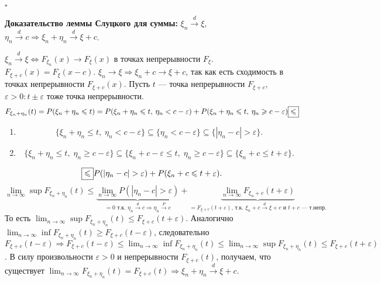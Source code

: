 \documentclass[12pt]{report}
\theoremstyle{definition}
\begin{document}
$\square$


\textbf{Доказательство леммы Слуцкого для суммы:} $\xi_n \xrightarrow{d} \xi$, $\eta_n \xrightarrow{d} c \Rightarrow \xi_n + \eta_n \xrightarrow{d} \xi + c$.

$\xi_n \xrightarrow{d} \xi \Leftrightarrow F_{\xi_n}(x) \rightarrow F_\xi(x)$ в точках непрерывности $F_\xi$. $F_{\xi+c}(x) = F_\xi(x-c)$. $\xi_n \rightarrow \xi \Rightarrow \xi_n + c \rightarrow \xi + c$, так как есть сходимость в точках непрерывности $F_{\xi + c}(x)$.
Пусть $t$ — точка непрерывности $F_{\xi + c}$, $\varepsilon > 0 : t \pm \varepsilon$ тоже точка непрерывности.
$$F_{\xi_n + \eta_n}(t) = P(\xi_n + \eta_n \leqslant t) = P(\xi_n + \eta_n \leqslant t, \:\eta_n < c - \varepsilon) + P(\xi_n + \eta_n \leqslant t, \:\eta_n \geqslant c - \varepsilon) \fbox{$\leqslant$}$$
\begin{enumerate}
	\item $$\{\xi_n + \eta_n \leqslant t, \; \eta_n < c - \varepsilon\} \subseteq \{\eta_n < c - \varepsilon\} \subseteq \{|\eta_n - c| > \varepsilon\}.$$
	\item $$\{\xi_n + \eta_n \leqslant t, \; \eta_n \geqslant c - \varepsilon\} \subseteq \{\xi_n + c - \varepsilon \leqslant t, \; \eta_n \geqslant c - \varepsilon\} \subseteq \{\xi_n + c \leqslant t + \varepsilon\}.$$
\end{enumerate}

$$\fbox{$\leqslant$} P(|\eta_n-c| > \varepsilon) + P(\xi_n + c \leqslant t + \varepsilon).$$
$$\lim_{n\to \infty} \sup F_{\xi_n + \eta_n}(t) \leqslant \underbrace{\lim_{n\to \infty} P(|\eta_n - c| > \varepsilon)}_{=0\text{ т.к. }\eta_n \xrightarrow{d} c \Rightarrow\eta_n \xrightarrow{P} c} + \underbrace{\lim_{n\to\infty}F_{\xi_n + c}(t + \varepsilon)}_{=F_{\xi + c}(t+\varepsilon)\text{, т.к. }\xi_n+c\xrightarrow{d}\xi+c\text{ и } t + c\text{ — т.непр.}}$$
То есть $\displaystyle{\lim_{n\to\infty}\sup F_{\xi_n + \eta_n}(t) \leqslant F_{\xi+c}(t+\varepsilon)}$. Аналогично $\displaystyle{\lim_{n\to\infty}\inf F_{\xi_n+\eta_n}(t) \geqslant F_{\xi + c}(t - \varepsilon)}$, следовательно $F_{\xi + c}(t - \varepsilon) \Rightarrow F_{\xi+c}(t-\varepsilon) \leqslant \displaystyle{\lim_{n\to\infty}}\inf F_{\xi_n + \eta_n}(t) \leqslant \displaystyle{\lim_{n\to\infty}\sup F_{\xi_n+\eta_n}(t) \leqslant F_{\xi+c}(t+\varepsilon)}$. В силу произвольности $\varepsilon > 0$ и непрерывности $F_{\xi+c}(t)$, получаем, что существует $\displaystyle{\lim_{n\to\infty}}F_{\xi_n+\eta_n}(t) = F_{\xi+c}(t) \Rightarrow \xi_n + \eta_n \xrightarrow{d} \xi + c$. 
\end{document}
